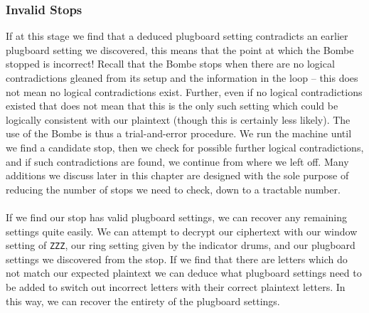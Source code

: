 
\subsubsection{Invalid Stops}
If at this stage we find that a deduced plugboard setting contradicts
an earlier plugboard setting we discovered, this means that the point
at which the Bombe stopped is incorrect! Recall that the Bombe stops
when there are no logical contradictions gleaned from its setup and
the information in the loop -- this does not mean no logical
contradictions exist. Further, even if no logical contradictions
existed that does not mean that this is the only such setting which could
be logically consistent with our plaintext (though this is certainly
less likely). The use of the Bombe is thus a trial-and-error
procedure. We run the machine until we find a candidate stop, then we
check for possible further logical contradictions, and if such
contradictions are found, we continue from where we left off. Many
additions we discuss later in this chapter are designed with the sole
purpose of reducing the number of stops we need to check, down to a
tractable number.
\\\\If we find our stop has valid plugboard settings, we can recover
any remaining settings quite easily. We can attempt to decrypt our
ciphertext with our window setting of \texttt{ZZZ}, our ring setting
given by the indicator drums, and our plugboard settings we
discovered from the stop. If we find that there are letters which do
not match our expected plaintext we can deduce what plugboard
settings need to be added to switch out incorrect letters with their
correct plaintext letters. In this way, we can recover the entirety of
the plugboard settings.

